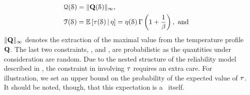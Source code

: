 \begin{align*}
  & \qoiQ(\schedule) = \norm[\infty]{\mQ(\schedule)}, \\
  & \qoiT(\schedule) = \expectation{\T(\schedule) \, | \, \eta} = \eta(\schedule) \, \Gamma\left(1 + \frac{1}{\beta}\right), \text{ and}
\end{align*}
$\norm[\infty]{\mQ}$ denotes the extraction of the maximal value from the temperature profile $\mQ$.
The last two constraints, \ie,  and , are probabilistic as the quantities under consideration are random.
Due to the nested structure of the reliability model described in , the constraint in  involving $\T$ requires an extra care.
For illustration, we set an upper bound on the probability of the expected value of $\T$.
It should be noted, though, that this expectation is a \rv\ itself.
